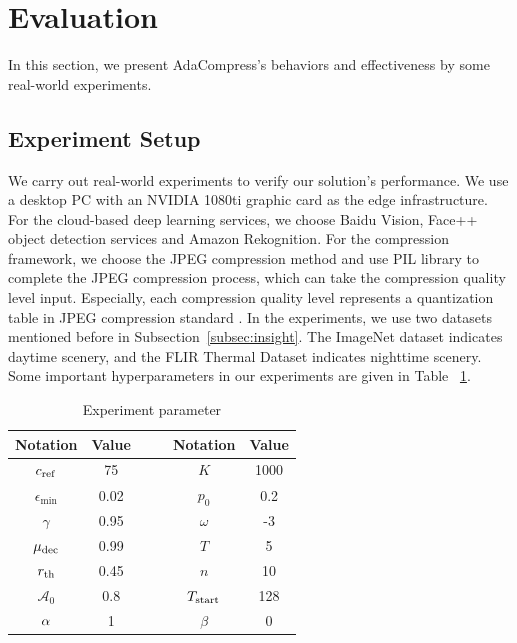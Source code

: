 \section{Evaluation}
\label{Section: evaluation}

In this section, we present AdaCompress's behaviors and effectiveness by some real-world experiments. %

\subsection{Experiment Setup}

We carry out real-world experiments to verify our solution's performance. We use a desktop PC with an NVIDIA 1080ti graphic card as the edge infrastructure. For the cloud-based deep learning services, we choose Baidu Vision, Face++ object detection services and Amazon Rekognition. {\color{revise3}For the compression framework, we choose the JPEG compression method and use PIL library \cite{pillow_benchmark} to complete the JPEG compression process, which can take the compression quality level input. Especially, each compression quality level represents a quantization table in JPEG compression standard \cite{jpeg}.} In the experiments, we use two datasets mentioned before in Subsection~\ref{subsec:insight}. The ImageNet dataset indicates daytime scenery, and the FLIR Thermal Dataset indicates nighttime scenery. Some important hyperparameters in our experiments are given in Table ~\ref{tab: parameters}.

\begin{table}[!t]
	\centering
	\caption{Experiment parameter}
	\label{tab: parameters}
	\begin{tabular}{cccccc}
		\toprule
		Notation          & Value & & & Notation     & Value  \\ \midrule
		$c_{\rm ref}$ & 75    & & & $K$      & 1000   \\
		$\epsilon_{\min}$    & 0.02  & & & $p_0$    & 0.2    \\
		$\gamma$      & 0.95  & & & $\omega$ & -3   \\
		$ \mu_{\rm dec} $ & 0.99 & & & $ T $ & 5  \\
		$r_{\rm th}$  & 0.45   & & &   $ n  $  &  10      \\ 
		{\color{revise} $ \mathcal{A}_0 $} & {\color{revise}0.8} & & & {\color{revise}$ T_{\rm start} $} & {\color{revise}128} \\
		$ {\color{revise}\alpha} $ & {\color{revise}1} & & & {\color{revise}$ \beta $} & {\color{revise}0}  \\ \bottomrule
	\end{tabular}
\end{table}

